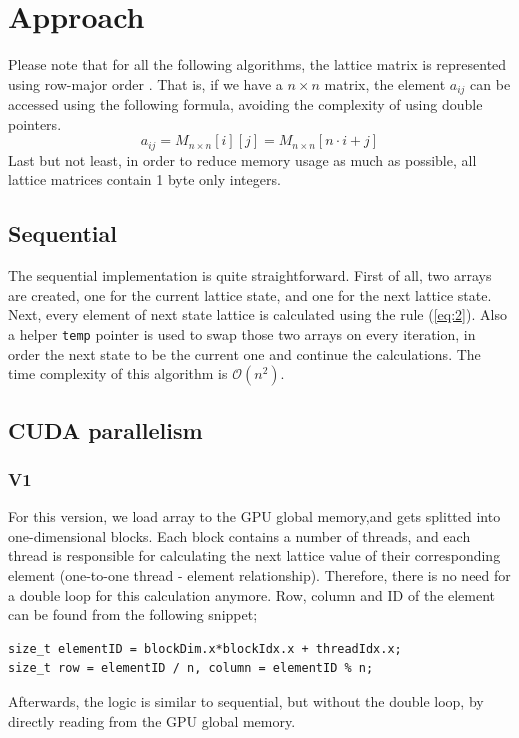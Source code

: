 \documentclass[11pt]{article}
\begin{document}
\section{Approach}
\label{sec:org3837ec8}
Please note that for all the following algorithms, the lattice matrix is represented using row-major order \autocite{enwiki:1161536790}. That is, if we have a \(n \times n\) matrix, the element \(a_{ij}\) can be accessed using the following formula, avoiding the complexity of using double pointers.
\begin{equation}
\label{eq:1}
a_{ij} =  M_{n \times n}[i][j] = M_{n \times n}[n \cdot i + j]
\end{equation}
Last but not least, in order to reduce memory usage as much as possible, all lattice matrices contain 1 byte only integers.
\subsection{Sequential}
\label{sec:org6d19496}
The sequential implementation is quite straightforward. First of all, two arrays are created, one for the current lattice state, and one for the next lattice state. Next, every element of next state lattice is calculated using the rule (\ref{eq:2}). Also a helper \texttt{temp} pointer is used to swap those two arrays on every iteration, in order the next state to be the current one and continue the calculations. The time complexity of this algorithm is \(\mathcal{O}(n^{2})\).
\subsection{CUDA parallelism}
\label{sec:org7258913}
\subsubsection{V1}
\label{sec:orga43e6ce}
For this version, we load array to the GPU global memory,and gets splitted into one-dimensional blocks. Each block contains a number of threads, and each thread is responsible for calculating the next lattice value of their corresponding element (one-to-one thread - element relationship). Therefore, there is no need for a double loop for this calculation anymore. Row, column and ID of the element can be found from the following snippet;
\begin{verbatim}
size_t elementID = blockDim.x*blockIdx.x + threadIdx.x;
size_t row = elementID / n, column = elementID % n;
\end{verbatim}
Afterwards, the logic is similar to sequential, but without the double loop, by directly reading from the GPU global memory.
\end{document}
